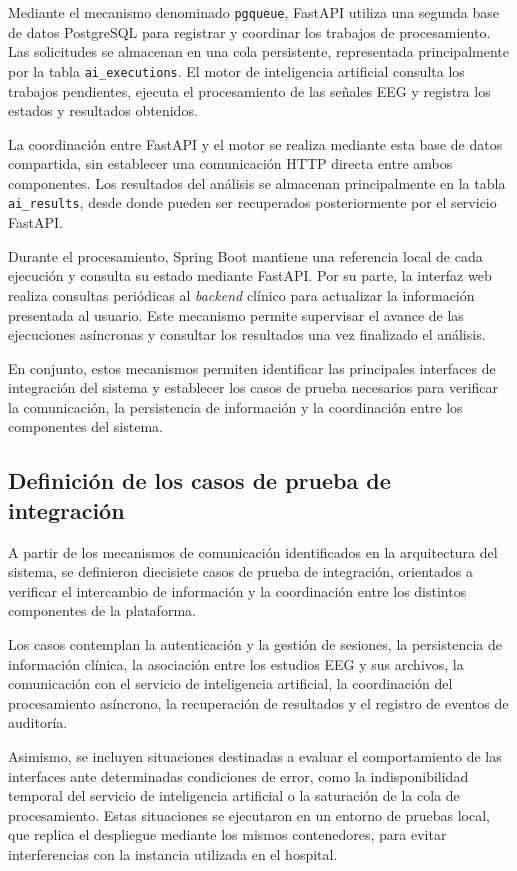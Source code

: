Mediante el mecanismo denominado \texttt{pgqueue}, FastAPI utiliza una segunda base de datos PostgreSQL para registrar y coordinar los trabajos de procesamiento. Las solicitudes se almacenan en una cola persistente, representada principalmente por la tabla \texttt{ai\_executions}. El motor de inteligencia artificial consulta los trabajos pendientes, ejecuta el procesamiento de las señales EEG y registra los estados y resultados obtenidos.

La coordinación entre FastAPI y el motor se realiza mediante esta base de datos compartida, sin establecer una comunicación HTTP directa entre ambos componentes. Los resultados del análisis se almacenan principalmente en la tabla \texttt{ai\_results}, desde donde pueden ser recuperados posteriormente por el servicio FastAPI.

Durante el procesamiento, Spring Boot mantiene una referencia local de cada ejecución y consulta su estado mediante FastAPI. Por su parte, la interfaz web realiza consultas periódicas al \textit{backend} clínico para actualizar la información presentada al usuario. Este mecanismo permite supervisar el avance de las ejecuciones asíncronas y consultar los resultados una vez finalizado el análisis.

En conjunto, estos mecanismos permiten identificar las principales interfaces de integración del sistema y establecer los casos de prueba necesarios para verificar la comunicación, la persistencia de información y la coordinación entre los componentes del sistema.


\subsection{Definición de los casos de prueba de integración}
\label{subsec:casos_pruebas_integracion}

A partir de los mecanismos de comunicación identificados en la arquitectura del sistema, se definieron diecisiete casos de prueba de integración, orientados a verificar el intercambio de información y la coordinación entre los distintos componentes de la plataforma.

Los casos contemplan la autenticación y la gestión de sesiones, la persistencia de información clínica, la asociación entre los estudios EEG y sus archivos, la comunicación con el servicio de inteligencia artificial, la coordinación del procesamiento asíncrono, la recuperación de resultados y el registro de eventos de auditoría.

Asimismo, se incluyen situaciones destinadas a evaluar el comportamiento de las interfaces ante determinadas condiciones de error, como la indisponibilidad temporal del servicio de inteligencia artificial o la saturación de la cola de procesamiento. Estas situaciones se ejecutaron en un entorno de pruebas local, que replica el despliegue mediante los mismos contenedores, para evitar interferencias con la instancia utilizada en el hospital.

